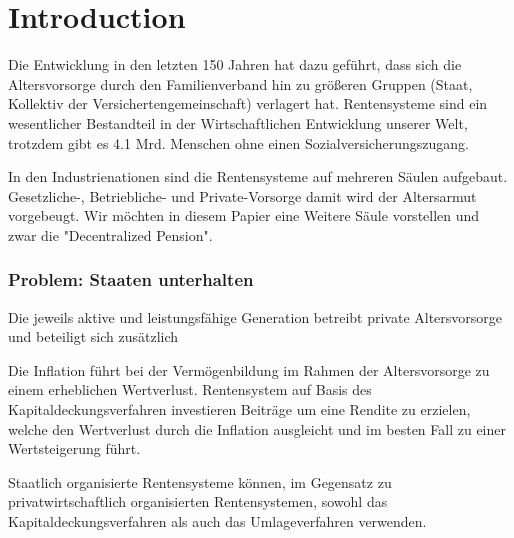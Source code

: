 \section{Introduction}


Die Entwicklung in den letzten 150 Jahren hat dazu geführt, dass sich die Altersvorsorge durch den Familienverband hin zu größeren Gruppen (Staat, Kollektiv der Versichertengemeinschaft) verlagert hat. Rentensysteme sind ein wesentlicher Bestandteil in der Wirtschaftlichen Entwicklung unserer Welt, trotzdem gibt es 4.1 Mrd. Menschen ohne einen Sozialversicherungszugang. 

In den Industrienationen sind die Rentensysteme auf mehreren Säulen aufgebaut. Gesetzliche-, Betriebliche- und Private-Vorsorge damit wird der Altersarmut vorgebeugt. Wir möchten in diesem Papier eine Weitere Säule vorstellen und zwar die "Decentralized Pension". 


\subsubsection*{Problem: Staaten unterhalten}

Die jeweils aktive und leistungsfähige Generation betreibt private Altersvorsorge und beteiligt sich zusätzlich 

Die Inflation führt bei der Vermögenbildung im Rahmen der Altersvorsorge zu einem erheblichen Wertverlust. 
Rentensystem auf Basis des Kapitaldeckungsverfahren investieren Beiträge um eine Rendite zu erzielen, welche den Wertverlust durch die Inflation ausgleicht und im besten Fall zu einer Wertsteigerung führt.

Staatlich organisierte Rentensysteme können, im Gegensatz zu privatwirtschaftlich organisierten Rentensystemen, sowohl das Kapitaldeckungsverfahren als auch das Umlageverfahren verwenden. 

